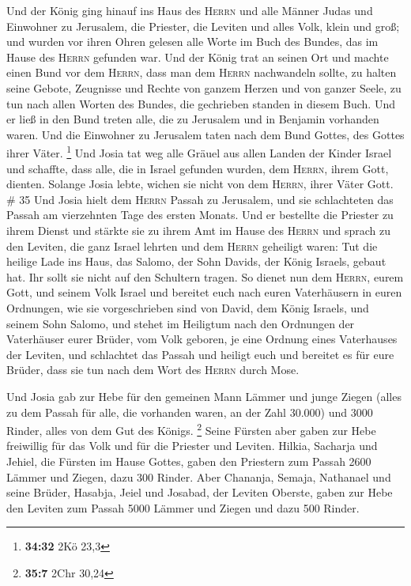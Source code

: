  Und der König ging hinauf ins Haus des \textsc{Herrn}
und alle Männer Judas und Einwohner zu Jerusalem, die Priester, die
Leviten und alles Volk, klein und groß; und wurden vor ihren Ohren
gelesen alle Worte im Buch des Bundes, das im Hause des \textsc{Herrn}
gefunden war.  Und der König trat an seinen Ort und
machte einen Bund vor dem \textsc{Herrn}, dass man dem \textsc{Herrn}
nachwandeln sollte, zu halten seine Gebote, Zeugnisse und Rechte von
ganzem Herzen und von ganzer Seele, zu tun nach allen Worten des Bundes,
die gechrieben standen in diesem Buch.  Und er ließ in
den Bund treten alle, die zu Jerusalem und in Benjamin vorhanden waren.
Und die Einwohner zu Jerusalem taten nach dem Bund Gottes, des Gottes
ihrer Väter. \footnote{\textbf{34:32} 2Kö 23,3}  Und
Josia tat weg alle Gräuel aus allen Landen der Kinder Israel und
schaffte, dass alle, die in Israel gefunden wurden, dem \textsc{Herrn},
ihrem Gott, dienten. Solange Josia lebte, wichen sie nicht von dem
\textsc{Herrn}, ihrer Väter Gott. \# 35  Und Josia hielt
dem \textsc{Herrn} Passah zu Jerusalem, und sie schlachteten das Passah
am vierzehnten Tage des ersten Monats.  Und er bestellte
die Priester zu ihrem Dienst und stärkte sie zu ihrem Amt im Hause des
\textsc{Herrn}  und sprach zu den Leviten, die ganz Israel
lehrten und dem \textsc{Herrn} geheiligt waren: Tut die heilige Lade ins
Haus, das Salomo, der Sohn Davids, der König Israels, gebaut hat. Ihr
sollt sie nicht auf den Schultern tragen. So dienet nun dem
\textsc{Herrn}, eurem Gott, und seinem Volk Israel  und
bereitet euch nach euren Vaterhäusern in euren Ordnungen, wie sie
vorgeschrieben sind von David, dem König Israels, und seinem Sohn
Salomo,  und stehet im Heiligtum nach den Ordnungen der
Vaterhäuser eurer Brüder, vom Volk geboren, je eine Ordnung eines
Vaterhauses der Leviten,  und schlachtet das Passah und
heiligt euch und bereitet es für eure Brüder, dass sie tun nach dem Wort
des \textsc{Herrn} durch Mose.

 Und Josia gab zur Hebe für den gemeinen Mann Lämmer und
junge Ziegen (alles zu dem Passah für alle, die vorhanden waren, an der
Zahl 30.000) und 3000 Rinder, alles von dem Gut des Königs. \footnote{\textbf{35:7}
  2Chr 30,24}  Seine Fürsten aber gaben zur Hebe
freiwillig für das Volk und für die Priester und Leviten. Hilkia,
Sacharja und Jehiel, die Fürsten im Hause Gottes, gaben den Priestern
zum Passah 2600 Lämmer und Ziegen, dazu 300 Rinder.  Aber
Chananja, Semaja, Nathanael und seine Brüder, Hasabja, Jeiel und
Josabad, der Leviten Oberste, gaben zur Hebe den Leviten zum Passah 5000
Lämmer und Ziegen und dazu 500 Rinder.

